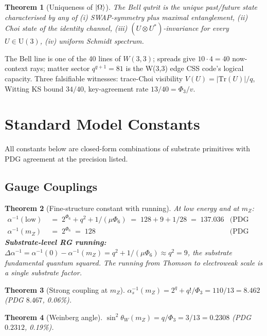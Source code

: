 \documentclass[11pt]{article}
\newtheorem{theorem}{Theorem}[section]
\begin{document}
\begin{theorem}[Uniqueness of $\ket{\Omega}$]\label{thm:bell_unique}
The Bell qutrit is the unique past/future state characterised by any of
(i) SWAP-symmetry plus maximal entanglement, (ii) Choi state of the
identity channel, (iii) $(U\otimes U^*)$-invariance for every
$U\in\mathrm{U}(3)$, (iv) uniform Schmidt spectrum.
\end{theorem}

The Bell line is one of the 40 lines of $W(3,3)$; spreads give
$10\cdot 4 = 40$ now-context rays; matter sector $q^{q+1} = 81$ is
the W(3,3) edge CSS code's logical capacity.  Three falsifiable
witnesses: trace-Choi visibility $V(U) = |\mathrm{Tr}(U)|/q$, Witting
KS bound $34/40$, key-agreement rate $13/40 = \Phi_3/v$.

\section{Standard Model Constants}

All constants below are closed-form combinations of substrate
primitives with PDG agreement at the precision listed.

\subsection{Gauge Couplings}

\begin{theorem}[Fine-structure constant with running]\label{thm:alpha}
At low energy and at $m_Z$:
\begin{align*}
  \alpha^{-1}(\text{low}) &\;=\; 2^{\Phi_6} + q^2 + 1/(\mu\Phi_6)
    \;=\; 128 + 9 + 1/28 \;=\; 137.036
    & \text{(PDG 137.036, 4 ppm)} \\
  \alpha^{-1}(m_Z)        &\;=\; 2^{\Phi_6}
    \;=\; 128
    & \text{(PDG 127.94, 0.05\%)}
\end{align*}
\textbf{Substrate-level RG running:}
$\Delta\alpha^{-1} = \alpha^{-1}(0) - \alpha^{-1}(m_Z) = q^2 + 1/(\mu\Phi_6)
\approx q^2 = 9$, the substrate fundamental quantum squared.  The
running from Thomson to electroweak scale is a single substrate factor.
\end{theorem}

\begin{theorem}[Strong coupling at $m_Z$]\label{thm:alpha_s}
$\alpha_s^{-1}(m_Z) = 2^q + q!/\Phi_3 = 110/13 = 8.462$
(PDG $8.467$, 0.06\%).
\end{theorem}

\begin{theorem}[Weinberg angle]\label{thm:weinberg}
$\sin^2\theta_W(m_Z) = q/\Phi_3 = 3/13 = 0.2308$
(PDG $0.2312$, 0.19\%).
\end{theorem}
\end{document}
